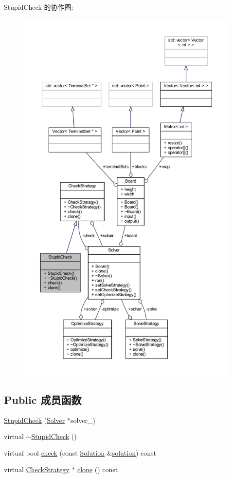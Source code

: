 Stupid\+Check 的协作图\+:
\nopagebreak
\begin{figure}[H]
\begin{center}
\leavevmode
\includegraphics[height=550pt]{classStupidCheck__coll__graph}
\end{center}
\end{figure}
\subsection*{Public 成员函数}
\begin{DoxyCompactItemize}
\item 
\hyperlink{classStupidCheck_a5d9cfbf24ede46fe72f85817996081d2}{Stupid\+Check} (\hyperlink{classSolver}{Solver} $\ast$solver\+\_\+)
\item 
virtual \hyperlink{classStupidCheck_a8f0518b4d64dd33ef27f9af0117f9dd2}{$\sim$\+Stupid\+Check} ()
\item 
virtual bool \hyperlink{classStupidCheck_a6291b52893e1caf4dc84e195dc79e534}{check} (const \hyperlink{classSolution}{Solution} \&\hyperlink{classes_8txt_aa43d5190bbc491d9c9134146e01a248e}{solution}) const 
\item 
virtual \hyperlink{classCheckStrategy}{Check\+Strategy} $\ast$ \hyperlink{classStupidCheck_a5c2425603803daf7d190771623c78bcd}{clone} () const 
\end{DoxyCompactItemize}
